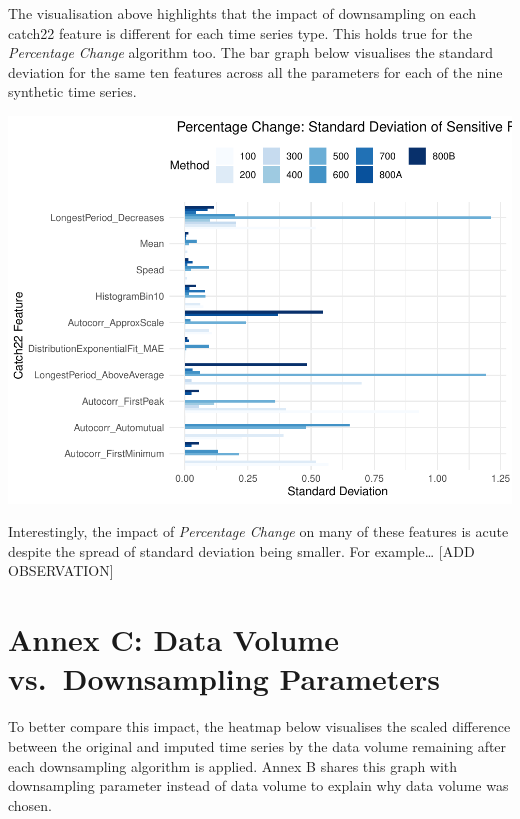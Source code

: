 \documentclass{article}
\begin{document}
The visualisation above highlights that the impact of downsampling on
each catch22 feature is different for each time series type. This holds
true for the \emph{Percentage Change} algorithm too. The bar graph below
visualises the standard deviation for the same ten features across all
the parameters for each of the nine synthetic time series.

\includegraphics{210431461_CSC8639_Dissertation_files/figure-latex/PCSensitivity-1.pdf}

Interestingly, the impact of \emph{Percentage Change} on many of these
features is acute despite the spread of standard deviation being
smaller. For example\ldots{} {[}ADD OBSERVATION{]}

\hypertarget{annex-c-data-volume-vs.-downsampling-parameters}{%
\section{Annex C: Data Volume vs.~Downsampling
Parameters}\label{annex-c-data-volume-vs.-downsampling-parameters}}

To better compare this impact, the heatmap below visualises the scaled
difference between the original and imputed time series by the data
volume remaining after each downsampling algorithm is applied. Annex B
shares this graph with downsampling parameter instead of data volume to
explain why data volume was chosen.
\end{document}

